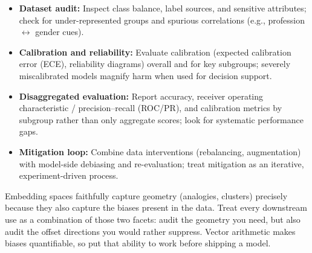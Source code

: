 \begin{tcolorbox}[summarybox, title={Practical bias checks}]
\begin{itemize}
    \item \textbf{Dataset audit:} Inspect class balance, label sources, and sensitive attributes; check for under-represented groups and spurious correlations (e.g., profession \(\leftrightarrow\) gender cues).
    \item \textbf{Calibration and reliability:} Evaluate calibration (expected calibration error (ECE), reliability diagrams) overall and for key subgroups; severely miscalibrated models magnify harm when used for decision support.
    \item \textbf{Disaggregated evaluation:} Report accuracy, receiver operating characteristic / precision--recall (ROC/PR), and calibration metrics by subgroup rather than only aggregate scores; look for systematic performance gaps.
    \item \textbf{Mitigation loop:} Combine data interventions (rebalancing, augmentation) with model-side debiasing and re-evaluation; treat mitigation as an iterative, experiment-driven process.
\end{itemize}
\end{tcolorbox}

\begin{tcolorbox}[summarybox, title={Author's note: embeddings mix geometry and bias}]
Embedding spaces faithfully capture geometry (analogies, clusters) precisely because they also capture the biases present in the data. Treat every downstream use as a combination of those two facets: audit the geometry you need, but also audit the offset directions you would rather suppress. Vector arithmetic makes biases quantifiable, so put that ability to work before shipping a model.
\end{tcolorbox}

